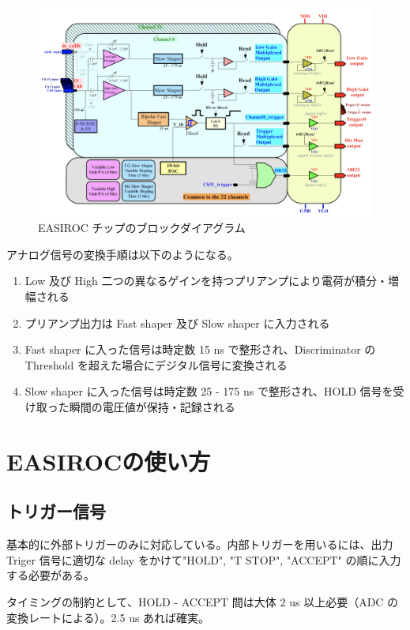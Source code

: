 \documentclass[a4paper]{report}
\begin{document}
\begin{figure}[H]
\begin{center}
\includegraphics[width = 13.0cm, bb= 0 0 1167 735]{5.png}
\end{center}
\caption{EASIROC チップのブロックダイアグラム}
\label{fig:}
\end{figure}

アナログ信号の変換手順は以下のようになる。
\begin{enumerate}
\item Low 及び High 二つの異なるゲインを持つプリアンプにより電荷が積分・増幅される
\item プリアンプ出力は Fast shaper 及び Slow shaper に入力される
\item Fast shaper に入った信号は時定数 15 ns で整形され、Discriminator の Threshold を超えた場合にデジタル信号に変換される
\item Slow shaper に入った信号は時定数 25 - 175 ns で整形され、HOLD 信号を受け取った瞬間の電圧値が保持・記録される
\end{enumerate}


\newpage
\section{EASIROCの使い方}
\subsection{トリガー信号}
基本的に外部トリガーのみに対応している。内部トリガーを用いるには、出力 Triger 信号に適切な delay をかけて"HOLD", "T STOP", "ACCEPT" の順に入力する必要がある。

タイミングの制約として、HOLD - ACCEPT 間は大体 2 us 以上必要（ADC の変換レートによる）。2.5 us あれば確実。
\end{document}
